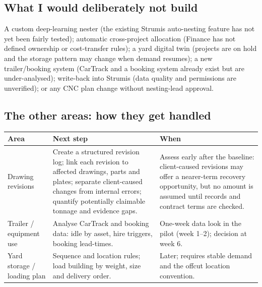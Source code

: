 \documentclass[10pt,a4paper]{article}
\begin{document}
\subsection{What I would deliberately not build}
A custom deep-learning nester (the existing Strumis auto-nesting feature has not yet been fairly tested); automatic cross-project allocation (Finance has not defined ownership or cost-transfer rules); a yard digital twin (projects are on hold and the storage pattern may change when demand resumes); a new trailer/booking system (CarTrack and a booking system already exist but are under-analysed); write-back into Strumis (data quality and permissions are unverified); or any CNC plan change without nesting-lead approval.

\subsection{The other areas: how they get handled}
\begin{tabular}{@{}P{3.4cm}P{6.6cm}P{5.9cm}@{}}
\toprule
\textbf{Area} & \textbf{Next step} & \textbf{When} \\
\midrule
Drawing revisions & Create a structured revision log; link each revision to affected drawings, parts and plates; separate client-caused changes from internal errors; quantify potentially claimable tonnage and evidence gaps. & Assess early after the baseline: client-caused revisions may offer a nearer-term recovery opportunity, but no amount is assumed until records and contract terms are checked. \\
Trailer / equipment use & Analyse CarTrack and booking data: idle by asset, hire triggers, booking lead-times. & One-week data look in the pilot (week 1--2); decision at week 6. \\
Yard storage / loading plan & Sequence and location rules; load building by weight, size and delivery order. & Later; requires stable demand and the offcut location convention. \\
\bottomrule
\end{tabular}

\end{document}
